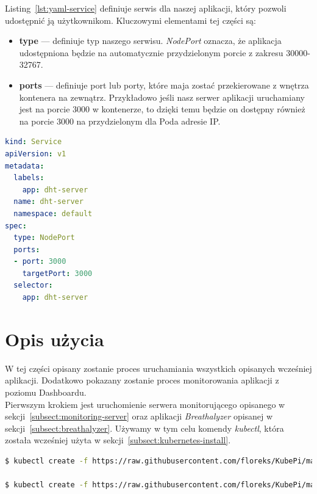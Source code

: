 \documentclass[12pt]{report}
\let\Oldsection\section
\renewcommand{\section}{\FloatBarrier\Oldsection}
\begin{document}
{\newpage
\noindent Listing~\ref{lst:yaml-service} definiuje serwis dla naszej aplikacji, który pozwoli udostępnić ją użytkownikom. Kluczowymi elementami tej części są:
\begin{itemize}
\item{\textbf{type} --- definiuje typ naszego serwisu. \textit{NodePort} oznacza, że aplikacja udo\-stępniona będzie na automatycznie przydzielonym porcie z zakresu 30000-32767. }
\item{\textbf{ports} --- definiuje port lub porty, które maja zostać przekierowane z wnętrza kontenera na zewnątrz. Przykładowo jeśli nasz serwer aplikacji uruchamiany jest na porcie 3000 w kontenerze, to dzięki temu będzie on dostępny również na porcie 3000 na przydzielonym dla Poda adresie IP.}
\end{itemize}
\begin{lstlisting}[language=yaml,caption=Definicja aplikacji uruchamianej w klastrze - część 3,label=lst:yaml-service]  
kind: Service
apiVersion: v1
metadata:
  labels:
    app: dht-server
  name: dht-server
  namespace: default
spec:
  type: NodePort
  ports:
  - port: 3000
    targetPort: 3000
  selector:
    app: dht-server
\end{lstlisting}

\section{Opis użycia}
W tej części opisany zostanie proces uruchamiania wszystkich opisanych wcześniej aplikacji. Dodatkowo pokazany zostanie proces monitorowania aplikacji z poziomu Dashboardu. \\

\noindent Pierwszym krokiem jest uruchomienie serwera monitorującego opisanego w sekcji~\ref{subsect:monitoring-server} oraz aplikacji \textit{Breathalyzer} opisanej w sekcji~\ref{subsect:breathalyzer}. Używamy w tym celu komendy \textit{kubectl}, która została wcześniej użyta w sekcji~\ref{subsect:kubernetes-install}.
\begin{lstlisting}[language=bash]
$ kubectl create -f https://raw.githubusercontent.com/floreks/KubePi/master/config/dht-server-arm.yaml

$ kubectl create -f https://raw.githubusercontent.com/floreks/KubePi/master/config/breathalyzer-arm.yaml
\end{lstlisting}

}
\end{document}
